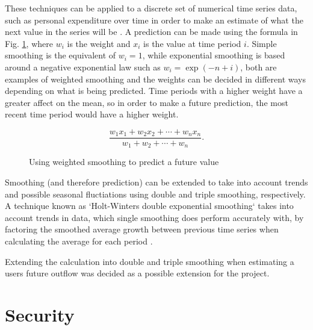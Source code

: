 These techniques can be applied to a discrete set of numerical time series data, such as personal expenditure over time in order to make an estimate of what the next value in the series will be \parencite{filliben2003nist}. A prediction can be made using the formula in Fig. \ref{fig:weightedmeanforumla}, where $w_{i}$ is the weight and $x_i$ is the value at time period $i$. Simple smoothing is the equivalent of $w_i = 1$, while exponential smoothing is based around a negative exponential law such as $w_i = \exp(-n+i)$, both are examples of weighted smoothing and the weights can be decided in different ways depending on what is being predicted. Time periods with a higher weight have a greater affect on the mean, so in order to make a future prediction, the most recent time period would have a higher weight. 

\begin{figure}[h]
    \centering
    \[
        \frac{w_1 x_1 + w_2 x_2 + \cdots + w_n x_n}{w_1 + w_2 + \cdots + w_n}.
    \]
    \caption{Using weighted smoothing to predict a future value}
    \label{fig:weightedmeanforumla}
\end{figure}

Smoothing (and therefore prediction) can be extended to take into account trends and possible seasonal fluctiations using double and triple smoothing, respectively. A technique known as `Holt-Winters double exponential smoothing` takes into account trends in data, which single smoothing does perform accurately with, by factoring the smoothed average growth between previous time series when calculating the average for each period \parencite{kalekar2004holtwinters}. 

% 
Extending the calculation into double and triple smoothing when estimating a users future outflow was decided as a possible extension for the project.  

\section{Security}


